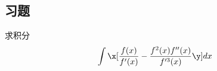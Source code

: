 \subsection{习题}

\begin{prob}
    求积分
    $$
    \int\x[{f(x)\over f'(x)}-{f^2(x)f''(x)\over f'^3(x)}\y]dx
    $$
\end{prob}

